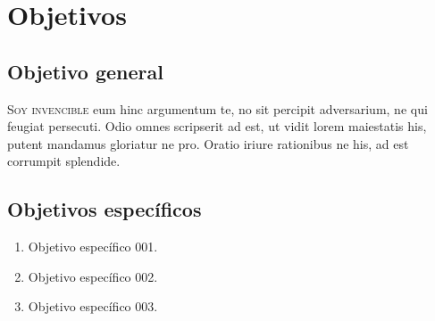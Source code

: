\chapter{Objetivos}
\section{Objetivo general}
\lettrine{S}{oy invencible} eum hinc argumentum te, no sit percipit adversarium, ne qui feugiat persecuti. Odio omnes scripserit ad est, ut vidit lorem maiestatis his, putent mandamus gloriatur ne pro. Oratio iriure rationibus ne his, ad est corrumpit splendide.

\section{Objetivos específicos}
\begin{enumerate}
	\item Objetivo específico 001.
	\item Objetivo específico 002.
	\item Objetivo específico 003.
\end{enumerate}
